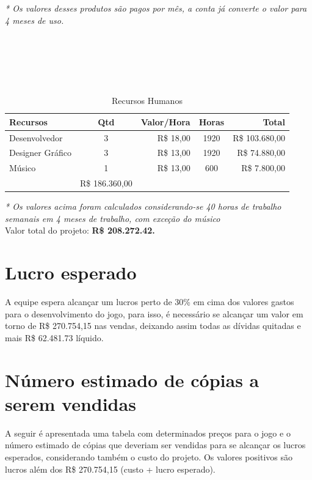 \documentclass[12pt]{article}
\begin{document}
\textit{* Os valores desses produtos são pagos por mês, a conta já converte o valor para 4 meses de uso.}
\\
\\
\\
\\
\\
\\

\begin{table}[h]
\centering
\begin{tabular}{lcrcr}
\toprule
\textbf{Recursos} & \textbf{Qtd} & \textbf{Valor/Hora} & \textbf{Horas} &
\textbf{Total} \\
\midrule
Desenvolvedor & 3 & R\$ 18,00 & 1920 & R\$ 103.680,00 \\
\rowcolor[gray]{0.9}
Designer Gráfico & 3 & R\$ 13,00 & 1920 & R\$ 74.880,00 \\
Músico & 1 & R\$ 13,00 & 600 & R\$ 7.800,00\\
\midrule
\rowcolor[gray]{0.7}
\multicolumn{4}{r}{\textbf{Total}} & R\$ 186.360,00\\
\bottomrule
\end{tabular}
\caption {Recursos Humanos}
\end{table}

\textit{* Os valores acima foram calculados considerando-se 40 horas de trabalho semanais em 4 meses de trabalho, com exceção do músico}
\\

Valor total do projeto: {\textbf{R\$ 208.272.42.}}

\section{Lucro esperado}

A equipe espera alcançar um lucros perto de 30\% em cima dos valores gastos para o desenvolvimento do jogo, para isso, é necessário se alcançar um valor em torno de R\$ 270.754,15 nas vendas, deixando assim todas as dívidas quitadas e mais R\$ 62.481.73 líquido.

\section{Número estimado de cópias a serem vendidas}

A seguir é apresentada uma tabela com determinados preços para o jogo e o número estimado de cópias que deveriam ser vendidas para se alcançar os lucros esperados, considerando também o custo do projeto. Os valores positivos são lucros além dos R\$ 270.754,15 (custo + lucro esperado). 
\end{document}
